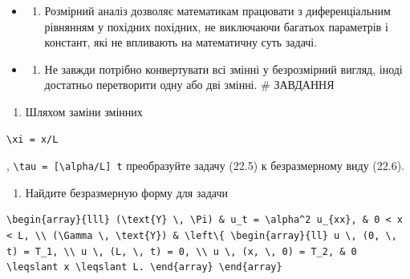 \documentclass[
  ukrainian,
]{article}
\providecommand{\tightlist}{%
  \setlength{\itemsep}{0pt}\setlength{\parskip}{0pt}}
\begin{document}
\begin{itemize}
\tightlist
\item
  \begin{enumerate}
  \def\labelenumi{\arabic{enumi}.}
  \setcounter{enumi}{1}
  \tightlist
  \item
    Розмірний аналіз дозволяє математикам працювати з диференціальним
    рівнянням у похідних похідних, не виключаючи багатьох параметрів і
    констант, які не впливають на математичну суть задачі.
  \end{enumerate}
\item
  \begin{enumerate}
  \def\labelenumi{\arabic{enumi}.}
  \setcounter{enumi}{2}
  \tightlist
  \item
    Не завжди потрібно конвертувати всі змінні у безрозмірний вигляд,
    іноді достатньо перетворити одну або дві змінні. \# ЗАВДАННЯ
  \end{enumerate}
\end{itemize}

\begin{enumerate}
\def\labelenumi{\arabic{enumi}.}
\tightlist
\item
  Шляхом заміни змінних
\end{enumerate}

\begin{verbatim}
\xi = x/L
\end{verbatim}

, \texttt{\textbackslash{}tau\ =\ {[}\textbackslash{}alpha/L{]}\ t}
преобразуйте задачу (22.5) к безразмерному виду (22.6).

\begin{enumerate}
\def\labelenumi{\arabic{enumi}.}
\setcounter{enumi}{1}
\tightlist
\item
  Найдите безразмерную форму для задачи
\end{enumerate}

\begin{verbatim}
\begin{array}{lll} (\text{Y} \, \Pi) & u_t = \alpha^2 u_{xx}, & 0 < x < L, \\ (\Gamma \, \text{Y}) & \left\{ \begin{array}{ll} u \, (0, \, t) = T_1, \\ u \, (L, \, t) = 0, \\ u \, (x, \, 0) = T_2, & 0 \leqslant x \leqslant L. \end{array} \end{array}
\end{verbatim}
\end{document}
